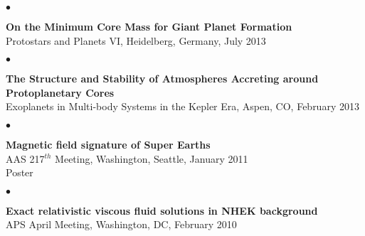 \documentclass[margin,line]{res}
\newenvironment{list2}{
  \begin{list}{$\bullet$}{%
      \setlength{\itemsep}{0in}
      \setlength{\parsep}{0in} \setlength{\parskip}{0in}
      \setlength{\topsep}{0in} \setlength{\partopsep}{0in} 
      \setlength{\leftmargin}{0.2in}}}{\end{list}}
\begin{document}
\begin{resume}
\begin{list2}
\item[] {\bf On the Minimum Core Mass for Giant Planet Formation} \\
Protostars and Planets VI, Heidelberg, Germany, July 2013  \\
\end{list2}



\begin{list2}
\item[] {\bf The Structure and Stability of Atmospheres Accreting around Protoplanetary Cores} \\
Exoplanets in Multi-body Systems in the Kepler Era, Aspen, CO, February 2013 \\
\end{list2}

\begin{list2}
\item[] {\bf Magnetic field signature of Super Earths} \\
AAS 217$^{th}$ Meeting, Washington, Seattle, January 2011  \\
Poster \\
\end{list2}

\vspace*{-.13in}
\begin{list2}
\item[] {\bf Exact relativistic viscous fluid solutions in NHEK background} \\
APS April Meeting, Washington, DC, February 2010  \\
\end{list2}




\end{resume}
\end{document}
